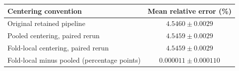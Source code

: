 \begin{tabular}{lc}
\toprule
Centering convention & Mean relative error (\%) \\
\midrule
Original retained pipeline & $4.5460\pm0.0029$ \\
Pooled centering, paired rerun & $4.5459\pm0.0029$ \\
Fold-local centering, paired rerun & $4.5459\pm0.0029$ \\
\midrule
Fold-local minus pooled (percentage points) & $0.000011\pm0.000110$ \\
\bottomrule
\end{tabular}
